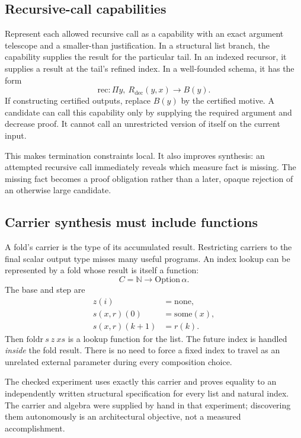 \documentclass[11pt,letterpaper]{article}
\newcommand{\code}[1]{\texttt{\detokenize{#1}}}
\theoremstyle{definition}
\theoremstyle{remark}
\begin{document}
\subsection{Recursive-call capabilities}

Represent each allowed recursive call as a capability with an exact argument telescope and a smaller-than justification. In a structural list branch, the capability supplies the result for the particular tail. In an indexed recursor, it supplies a result at the tail's refined index. In a well-founded schema, it has the form
\[
 \mathrm{rec} : \Pi y,\ R_{\mathrm{dec}}(y,x)\to B(y).
\]
If constructing certified outputs, replace $B(y)$ by the certified motive. A candidate can call this capability only by supplying the required argument and decrease proof. It cannot call an unrestricted version of itself on the current input.

This makes termination constraints local. It also improves synthesis: an attempted recursive call immediately reveals which measure fact is missing. The missing fact becomes a proof obligation rather than a later, opaque rejection of an otherwise large candidate.

\subsection{Carrier synthesis must include functions}

A fold's carrier is the type of its accumulated result. Restricting carriers to the final scalar output type misses many useful programs. An index lookup can be represented by a fold whose result is itself a function:
\[
 C = \mathbb N\to\mathrm{Option}\,\alpha.
\]
The base and step are
\begin{align}
 z(i)&=\mathrm{none},\nonumber\\
 s(x,r)(0)&=\mathrm{some}(x),\label{eq:indexstep}\\
 s(x,r)(k+1)&=r(k).\nonumber
\end{align}
Then $\mathrm{foldr}\ s\ z\ xs$ is a lookup function for the list. The future index is handled \emph{inside} the fold result. There is no need to force a fixed index to travel as an unrelated external parameter during every composition choice.

The checked \code{indexFold} experiment uses exactly this carrier and proves equality to an independently written structural specification for every list and natural index. The carrier and algebra were supplied by hand in that experiment; discovering them autonomously is an architectural objective, not a measured accomplishment.
\end{document}
